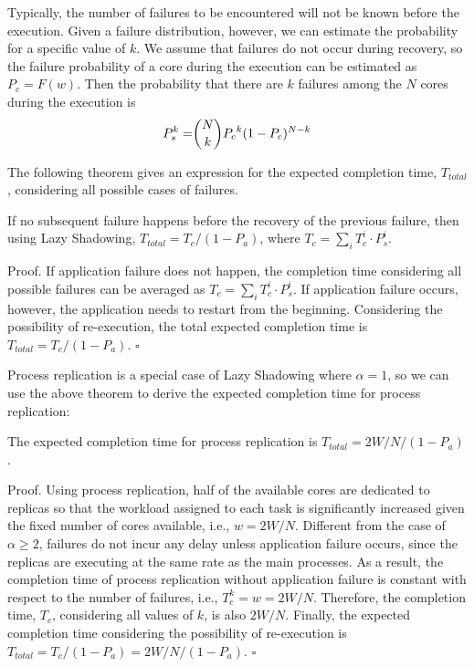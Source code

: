 Typically, the number of failures to be encountered will not be known before the execution. Given a failure distribution, however, we can estimate the probability for a specific value of $k$. We assume that failures do not occur during recovery, so the failure probability of a core during the execution can be estimated as $P_c = F(w)$. Then the probability that there are $k$ failures among the $N$ cores during the execution is 
\begin{equation}
\begin{split}
P_s^{k}= & \dbinom{N}{k}{P_c}^k(1-P_c)^{N-k} \\
\end{split}
\end{equation}

The following theorem gives an expression for the expected completion time, $T_{total}$, considering all possible cases of failures. 

\begin{theorem}
If no subsequent failure happens before the recovery of the previous failure, then using Lazy Shadowing,
$T_{total} = T_{c} / (1 - P_a)$, where $T_{c} = \sum_{i} T_{c}^{i} \cdot P_s^{i}$.
\end{theorem}

{\sc Proof}. If application failure does not happen, the completion time considering all possible failures can be averaged as $T_{c} = \sum_{i} T_{c}^{i} \cdot P_s^{i}$. If application failure occurs, however, the application needs to restart from the beginning. Considering the possibility of re-execution, the total expected completion time is $T_{total} = T_{c} / (1 - P_a)$.
$\square$

Process replication is a special case of Lazy Shadowing where $\alpha=1$, so we can use the above theorem to derive the expected completion time for process replication:

\begin{corollary}
The expected completion time for process replication is $T_{total} = 2W/N / (1 - P_a)$.
\end{corollary}

{\sc Proof}. Using process replication, half of the available cores are dedicated to replicas so that the workload assigned to each task is significantly increased given the fixed number of cores available, i.e., $w=2W/N$. Different from the case of $\alpha \ge 2$, failures do not incur any delay unless application failure occurs, since the replicas are executing at the same rate as the main processes. As a result, the completion time of process replication without application failure is constant with respect to the number of failures, i.e., $T_c^k=w=2W/N$. Therefore, the completion time, $T_c$, considering all values of $k$, is also $2W/N$. Finally, the expected completion time considering the possibility of re-execution is $T_{total} = T_c / (1 - P_a) = 2W/N / (1 - P_a)$.
$\square$

